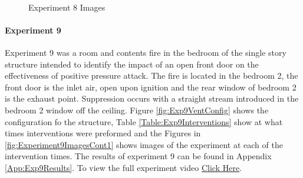 \documentclass{article}
\begin{document}
\begin{figure}[H]
	\ContinuedFloat 
	\centering 
	 \ 
	\caption{Experiment 8 Images}
	\label{fig:Experiment8ImagesCont3} 
\end{figure}

\paragraph{Experiment 9}\mbox{}

Experiment 9 was a room and contents fire in the bedroom of the single story structure intended to identify the impact of an open front door on the effectiveness of positive pressure attack. The fire is located in the bedroom 2, the front door is the inlet air, open upon ignition and the rear window of bedroom 2 is the exhaust point. Suppression occurs with a straight stream introduced in the bedroom 2 window off the ceiling. Figure \ref{fig:Exp9VentConfig} shows the configuration fo the structure, Table \ref{Table:Exp9Interventions} show at what times interventions were preformed and the Figures in \ref{fig:Experiment9ImagesCont1} shows images of the experiment at each of the intervention times. The results of experiment 9 can be found in Appendix \ref{App:Exp9Results}. To view the full experiment video \href{https://youtu.be/_t64OLbhjks}{Click Here}.
\end{document}
